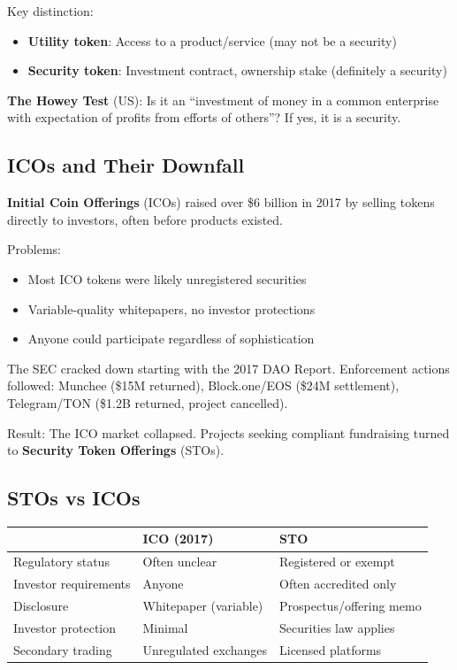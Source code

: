\documentclass[11pt,a4paper]{article}
\newcommand{\keyword}[1]{\textbf{\textcolor{AccentOrange}{#1}}}
\begin{document}
Key distinction:
\begin{itemize}
    \item \textbf{Utility token}: Access to a product/service (may not be a security)
    \item \textbf{Security token}: Investment contract, ownership stake (definitely a security)
\end{itemize}

\textbf{The Howey Test} (US): Is it an ``investment of money in a common enterprise with expectation of profits from efforts of others''? If yes, it is a security.

\subsection{ICOs and Their Downfall}

\keyword{Initial Coin Offerings} (ICOs) raised over \$6 billion in 2017 by selling tokens directly to investors, often before products existed.

Problems:
\begin{itemize}
    \item Most ICO tokens were likely unregistered securities
    \item Variable-quality whitepapers, no investor protections
    \item Anyone could participate regardless of sophistication
\end{itemize}

The SEC cracked down starting with the 2017 DAO Report. Enforcement actions followed: Munchee (\$15M returned), Block.one/EOS (\$24M settlement), Telegram/TON (\$1.2B returned, project cancelled).

Result: The ICO market collapsed. Projects seeking compliant fundraising turned to \keyword{Security Token Offerings} (STOs).

\subsection{STOs vs ICOs}

\begin{center}
\begin{tabular}{lll}
\toprule
& \textbf{ICO (2017)} & \textbf{STO} \\
\midrule
Regulatory status & Often unclear & Registered or exempt \\
Investor requirements & Anyone & Often accredited only \\
Disclosure & Whitepaper (variable) & Prospectus/offering memo \\
Investor protection & Minimal & Securities law applies \\
Secondary trading & Unregulated exchanges & Licensed platforms \\
\bottomrule
\end{tabular}
\end{center}
\end{document}
